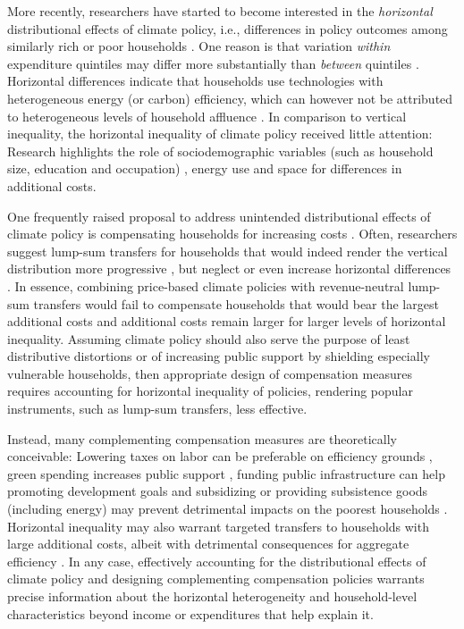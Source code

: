 \documentclass[12pt, a4paper]{article}
\begin{document}
More recently, researchers have started to become interested in the \textit{horizontal} distributional effects of climate policy, i.e., differences in policy outcomes among similarly rich or poor households \autocite{Rausch.2011,Fischer.2019}. One reason is that variation \textit{within} expenditure quintiles may differ more substantially than \textit{between} quintiles \autocite{Cronin.2019,Steckel.2021b,Pizer.2019}. Horizontal differences indicate that households use technologies with heterogeneous energy (or carbon) efficiency, which can however not be attributed to heterogeneous levels of household affluence \autocite{Hansel.2022}. In comparison to vertical inequality, the horizontal inequality of climate policy received little attention: Research highlights the role of sociodemographic variables (such as household size, education and occupation) \autocite{Grainger.2010,Buchs.2013,Farrell.2017,Missbach.2023}, energy use \autocite{Steckel.2021b,Missbach.2024} and space \autocite{Chan.2023} for differences in additional costs.

One frequently raised proposal to address unintended distributional effects of climate policy is compensating households for increasing costs \autocite{Klenert.2018,Baranzini.2017}. Often, researchers suggest lump-sum transfers for households that would indeed render the vertical distribution more progressive \autocite{Budolfson.2021,Steckel.2021b,vanderPloeg.2022}, but neglect or even increase horizontal differences \autocite{Cronin.2019,Hansel.2022}. In essence, combining price-based climate policies with revenue-neutral lump-sum transfers would fail to compensate households that would bear the largest additional costs and additional costs remain larger for larger levels of horizontal inequality. Assuming climate policy should also serve the purpose of least distributive distortions \autocite{Fischer.2019} or of increasing public support by shielding especially vulnerable households, then appropriate design of compensation measures requires accounting for horizontal inequality of policies, rendering popular instruments, such as lump-sum transfers, less effective. 

Instead, many complementing compensation measures are theoretically conceivable: Lowering taxes on labor can be preferable on efficiency grounds \autocite{Goulder.1995,Bento.2018}, green spending increases public support \autocite{Sommer.2022}, funding public infrastructure can help promoting development goals \autocite{Franks.2018} and subsidizing or providing subsistence goods (including energy) may prevent detrimental impacts on the poorest households \autocite{Greve.2022}. Horizontal inequality may also warrant targeted transfers to households with large additional costs, albeit with detrimental consequences for aggregate efficiency \autocite{Hansel.2022}. In any case, effectively accounting for the distributional effects of climate policy and designing complementing compensation policies warrants precise information about the horizontal heterogeneity and household-level characteristics beyond income or expenditures that help explain it. 
\end{document}
